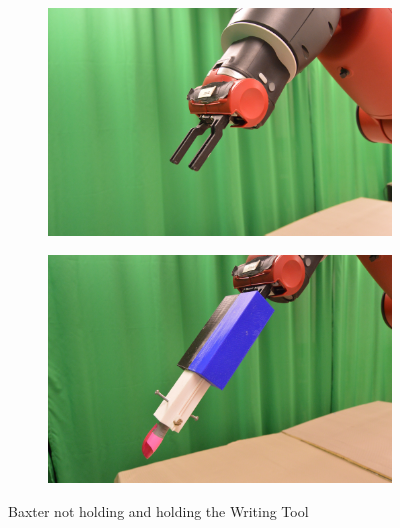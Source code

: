 \documentclass[letterpaper]{article}
\begin{document}
\begin{figure}[t]
\centering
\begin{subfigure}{.48\linewidth}
\includegraphics[width=\linewidth]{notholding.jpg}
\end{subfigure}
\hfill
\begin{subfigure}{.48\linewidth}
\includegraphics[width=\linewidth]{holding.jpg}
\end{subfigure}
\caption{Baxter not holding and holding the Writing Tool}
\label{wearing}
\end{figure}
\end{document}
